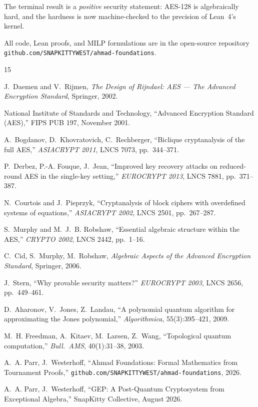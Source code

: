 \documentclass[11pt,letterpaper]{article}
\begin{document}
The terminal result is a \emph{positive} security statement: AES-128 is
algebraically hard, and the hardness is now machine-checked to the precision
of Lean~4's kernel.

All code, Lean proofs, and MILP formulations are in the open-source
repository \texttt{github.com/SNAPKITTYWEST/ahmad-foundations}.

\begin{thebibliography}{15}

J.~Daemen and V.~Rijmen,
\emph{The Design of Rijndael: AES --- The Advanced Encryption Standard},
Springer, 2002.

National Institute of Standards and Technology,
``Advanced Encryption Standard (AES),''
FIPS PUB 197, November 2001.

A.~Bogdanov, D.~Khovratovich, C.~Rechberger,
``Biclique cryptanalysis of the full AES,''
\emph{ASIACRYPT 2011}, LNCS 7073, pp.~344--371.

P.~Derbez, P.-A. Fouque, J.~Jean,
``Improved key recovery attacks on reduced-round AES in the single-key setting,''
\emph{EUROCRYPT 2013}, LNCS 7881, pp.~371--387.

N.~Courtois and J.~Pieprzyk,
``Cryptanalysis of block ciphers with overdefined systems of equations,''
\emph{ASIACRYPT 2002}, LNCS 2501, pp.~267--287.

S.~Murphy and M.~J.~B. Robshaw,
``Essential algebraic structure within the AES,''
\emph{CRYPTO 2002}, LNCS 2442, pp.~1--16.

C.~Cid, S.~Murphy, M.~Robshaw,
\emph{Algebraic Aspects of the Advanced Encryption Standard},
Springer, 2006.

J.~Stern,
``Why provable security matters?''
\emph{EUROCRYPT 2003}, LNCS 2656, pp.~449--461.

D.~Aharonov, V.~Jones, Z.~Landau,
``A polynomial quantum algorithm for approximating the Jones polynomial,''
\emph{Algorithmica}, 55(3):395--421, 2009.

M.~H. Freedman, A.~Kitaev, M.~Larsen, Z.~Wang,
``Topological quantum computation,''
\emph{Bull.\ AMS}, 40(1):31--38, 2003.

A.~A. Parr, J.~Westerhoff,
``Ahmad Foundations: Formal Mathematics from Tournament Proofs,''
\texttt{github.com/SNAPKITTYWEST/ahmad-foundations}, 2026.

A.~A. Parr, J.~Westerhoff,
``GEP: A Post-Quantum Cryptosystem from Exceptional Algebra,''
SnapKitty Collective, August 2026.

\end{thebibliography}
\end{document}

